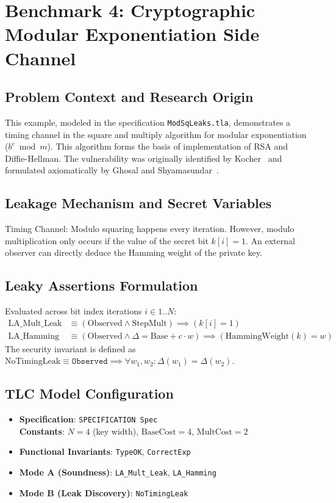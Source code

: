 \documentclass[a4paper,12pt]{report}
\begin{document}
\section{Benchmark 4: Cryptographic Modular Exponentiation Side Channel}

\subsection{Problem Context and Research Origin}
This example, modeled in the specification \texttt{ModSqLeaks.tla}, demonstrates a timing channel in the square and multiply algorithm for modular exponentiation ($b^e \bmod m$). This algorithm forms the basis of implementation of RSA and Diffie-Hellman. The vulnerability was originally identified by Kocher~\cite{kocher1996timing} and formulated axiomatically by Ghosal and Shyamasundar~\cite{ghosal2021axiomatic}.

\subsection{Leakage Mechanism and Secret Variables}
Timing Channel: Modulo squaring happens every iteration. However, modulo multiplication only occurs if the value of the secret bit $k[i] = 1$. An external observer can directly deduce the Hamming weight of the private key.

\subsection{Leaky Assertions Formulation}
Evaluated across bit index iterations $i \in 1..N$:
\begin{align*}
    \text{LA\_Mult\_Leak} &\equiv (\text{Observed} \land \text{StepMult}) \implies (k[i] = 1) \\
    \text{LA\_Hamming}   &\equiv (\text{Observed} \land \Delta = \text{Base} + c \cdot w) \implies (\text{HammingWeight}(k) = w)
\end{align*}
The security invariant is defined as $\text{NoTimingLeak} \equiv \texttt{Observed} \implies \forall w_1, w_2 : \Delta(w_1) = \Delta(w_2)$.

\subsection{TLC Model Configuration}
\begin{itemize}[itemsep=0.08em, topsep=0.08em]
    \item \textbf{Specification}: \texttt{SPECIFICATION Spec} \\
    \textbf{Constants}: $N = 4$ (key width), $\text{BaseCost} = 4$, $\text{MultCost} = 2$
    \item \textbf{Functional Invariants}: \texttt{TypeOK}, \texttt{CorrectExp}
    \item \textbf{Mode A (Soundness)}: \texttt{LA\_Mult\_Leak}, \texttt{LA\_Hamming}
    \item \textbf{Mode B (Leak Discovery)}: \texttt{NoTimingLeak}
\end{itemize}
\end{document}
